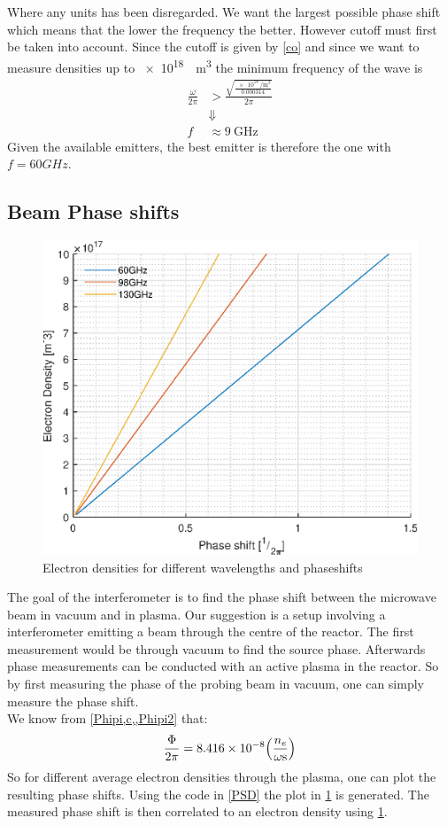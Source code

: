 Where any units has been disregarded. We want the largest possible phase shift which means that the lower the frequency the better. However cutoff must first be taken into account.
Since the cutoff is given by \cref{co} and since we want to measure densities up to \SI{e18}{\per\meter\cubed} the minimum frequency of the wave is
\begin{align}
	\frac{\omega}{2\pi} & > \frac{\sqrt{\frac{\SI{e18}{\per\meter\cubed}}{0.000314}}}{2\pi} \\
	                    & \Downarrow\nonumber                                               \\
	f                   & \approx \SI{9}{\giga\hertz}
\end{align}
Given the available emitters, the best emitter is therefore the one with \(f=60\si{GHz}\).
\subsection{Beam Phase shifts}
\begin{figure}
	\includegraphics[width=.5\textwidth]{MatlabFigures/PhaseShift/PhaseShift.eps}
	\caption{Electron densities for different wavelengths and phaseshifts}
	\label{PhPlot}
\end{figure}
The goal of the interferometer is to find the phase shift between the microwave beam in vacuum and in plasma. Our suggestion is a setup involving a interferometer emitting a beam through the centre of the reactor. The first measurement would be through vacuum to find the source phase. Afterwards phase measurements can be conducted with an active plasma in the reactor.
So by first measuring the phase of the probing beam in vacuum, one can simply measure the phase shift.\\
We know from \cref{Phipi,c,,Phipi2} that:
\begin{align}
	\frac{\Phi}{2\pi} = 8.416\times 10^{-8}\pqty{\frac{n_e}{\omega\si{\second}}}
\end{align}
So for different average electron densities through the plasma, one can plot the resulting phase shifts.
Using the code in \cref{PSD} the plot in \cref{PhPlot} is generated. The measured phase shift is then correlated to an electron density using \cref{PhPlot}.
